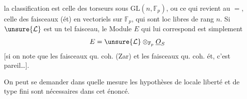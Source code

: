 la classification est celle des torseurs sous
$\mathrm{GL}(n,\mathbb F_p)$, ou ce qui revient au $=$, celle des
faisceaux (ét) en  vectoriels sur $\mathbb F_p$, qui
sont loc libres de rang $n$. Si $\unsure{\mathcal L}$ est un
tel faisceau, le Module $E$ qui lui
correspond est simplement
\[
E=\unsure{\mathcal L}\otimes_{\mathbb F_p}\underline O_S
\]
[si on note que les faisceaux qu. coh.
(Zar) et les faisceaux qu. coh. ét,
c'est pareil\ldots].

On peut se demander dans quelle mesure les
hypothèses de locale liberté et de type fini sont
nécessaires dans cet énoncé.
